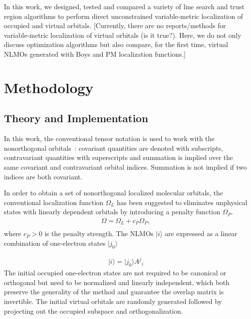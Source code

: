 \documentclass[aps,prl,reprint,amsmath,amssymb]{revtex4-1}
\newcommand{\ket}[1]{\ensuremath{\vert #1 \rangle}}
\begin{document}
In this work, we designed, tested and compared a variety of line search and trust region algorithms to perform direct unconstrained variable-metric localization of occupied and virtual orbitals. [Currently, there are no reports/methods for variable-metric localization of virtual orbitals (is it true?). Here, we do not only discuss optimization algorithms but also compare, for the first time, virtual NLMOs generated with Boys and PM localization functions.]


\section{Methodology}
\subsection{Theory and Implementation}
In this work, the conventional tensor notation is used to work with the nonorthogonal orbitals~\cite{head1998tensor}: covariant quantities are denoted with subscripts, contravariant quantities with superscripts and summation is implied over the same covariant and contravariant orbital indices. Summation is not implied if two indices are both covariant. 

In order to obtain a set of nonorthogonal localized molecular orbitals, the conventional localization function $\Omega_L$ has been suggested to eliminates unphysical states with linearly dependent orbitals by introducing a penalty function  $\Omega_P$.~\cite{luo2020direct} 
%
\begin{equation} \label{eq:fun-overall}
\begin{split}
\Omega = \Omega_L + c_P \Omega_P, \\
\end{split}
\end{equation}
%
where $c_P > 0$ is the penalty strength.
The NLMOs $\ket{i}$ are expressed as a linear combination of one-electron states $\ket{j_0}$

%
\begin{equation}
\begin{split}
\ket{i} = \ket{j_0} {A^j}_i 
\end{split}
\end{equation}
%
The initial occupied one-electron states are not required to be canonical or orthogonal but need to be normalized and linearly independent, which both preserve the generality of the method and guarantee the overlap matrix is invertible. The initial virtual orbitals are randomly generated followed by projecting out the occupied subspace and orthogonalization.
\end{document}
